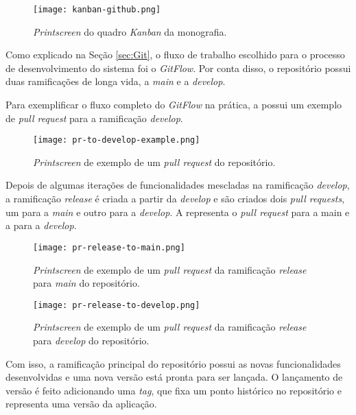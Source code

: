 \begin{figure}[!htb]
  \centering
  \texttt{[image: kanban-github.png]}
  \caption{\textit{Printscreen} do quadro \textit{Kanban} da monografia.}
  \label{fig:kanbanmono}
\end{figure}

Como explicado na Seção \ref{sec:Git}, o fluxo de trabalho escolhido para o processo de desenvolvimento do sistema foi o \textit{GitFlow}. Por conta disso, o repositório possui duas ramificações de longa vida, a \textit{main} e a \textit{develop}.

Para exemplificar o fluxo completo do \textit{GitFlow} na prática, a  possui um exemplo de \textit{pull request} para a ramificação \textit{develop}.

\begin{figure}[!htb]
  \centering
  \texttt{[image: pr-to-develop-example.png]}
  \caption{\textit{Printscreen} de exemplo de um \textit{pull request} do repositório.}
  \label{fig:cfpr}
\end{figure}

Depois de algumas iterações de funcionalidades mescladas na ramificação \textit{develop}, a ramificação \textit{release} é criada a partir da \textit{develop} e são criados dois \textit{pull requests}, um para a \textit{main} e outro para a \textit{develop}. A  representa o \textit{pull request} para a main e a  para a \textit{develop}.

\begin{figure}[!htb]
  \centering
  \texttt{[image: pr-release-to-main.png]}
  \caption{\textit{Printscreen} de exemplo de um \textit{pull request} da ramificação \textit{release} para \textit{main} do repositório.}
  \label{fig:releasemainpr}
\end{figure}

\begin{figure}[!htb]
  \centering
  \texttt{[image: pr-release-to-develop.png]}
  \caption{\textit{Printscreen} de exemplo de um \textit{pull request} da ramificação \textit{release} para \textit{develop} do repositório.}
  \label{fig:releasedeveloppr}
\end{figure}

Com isso, a ramificação principal do repositório possui as novas funcionalidades desenvolvidas e uma nova versão está pronta para ser lançada. O lançamento de versão é feito adicionando uma \textit{tag}, que fixa um ponto histórico no repositório e representa uma versão da aplicação.

